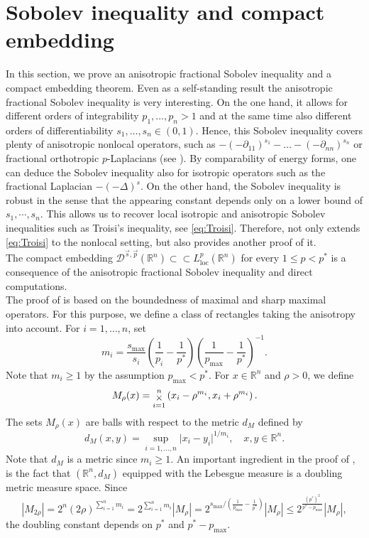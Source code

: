 \documentclass[11pt]{amsart}
\theoremstyle{plain}
\theoremstyle{definition}
\numberwithin{equation}{section}
\newcommand{\R}{\mathbb{R}}
\newcommand{\Dsp}{\mathcal{D}^{\vec{s},\vec{p}}(\mathbb{R}^n)}
\newcommand{\BIGOP}[1]
{
\mathop{\mathchoice%
{\raise-0.22em\hbox{\huge $#1$}}%
{\raise-0.05em\hbox{\Large $#1$}}{\hbox{\large $#1$}}{#1}}}
\newcommand{\bigtimes}{\BIGOP{\times}}
\begin{document}
\section{Sobolev inequality and compact embedding}\label{sec:Sob}
In this section, we prove an anisotropic fractional Sobolev inequality and a compact embedding theorem. 
Even as a self-standing result the anisotropic fractional Sobolev inequality is very interesting. On the one hand, it allows for different orders of integrability $p_1,\dots,p_n>1$ and at the same time also different orders of differentiability $s_1,\dots,s_n\in(0,1)$. Hence, this Sobolev inequality covers plenty of anisotropic nonlocal operators, such as $-(-\partial_{11})^{s_1} - \dots - (-\partial_{nn})^{s_n}$ or fractional orthotropic $p$-Laplacians (see \cite{CK}). 
By comparability of energy forms, one can deduce the Sobolev inequality also for isotropic operators such as the fractional Laplacian $-(-\Delta)^s$. On the other hand, the Sobolev inequality is robust in the sense that the appearing constant depends only on a lower bound of $s_1,\cdots,s_n$. This allows us to recover local isotropic and anisotropic Sobolev inequalities such as Troisi’s inequality, see \eqref{eq:Troisi}. Therefore,  not only extends \eqref{eq:Troisi} to the nonlocal setting, but also provides another proof of it.\\
The compact embedding $\Dsp \subset\subset L^{p}_{\mathrm{loc}}(\R^n)$ for every $1 \le p < p^{\ast}$ is a consequence of the anisotropic  fractional Sobolev inequality and direct computations.\\

The proof of  is based on the boundedness of maximal and sharp maximal operators. For this purpose, we define a class of rectangles taking the anisotropy into account. For $i=1,\dots, n$, set
\begin{equation} \label{eq:m_i}
m_i = \frac{s_{\max}}{s_i} \left( \frac{1}{p_i} - \frac{1}{p^{\ast}} \right) \left( \frac{1}{p_{\max}} - \frac{1}{p^{\ast}} \right)^{-1}.
\end{equation}
Note that $m_i \geq 1$ by the assumption $p_{\max} < p^{\ast}$. For $x \in \mathbb{R}^n$ and $\rho > 0$, we define
\begin{equation} \label{eq:M}
M_{\rho}(x) = \bigtimes_{i=1}^n \left(x_i-\rho^{m_i},x_i+\rho^{m_i} \right).
\end{equation}
The sets $M_{\rho}(x)$ are balls with respect to the metric $d_M$ defined by
\begin{equation*}
d_M(x,y) = \sup_{i = 1,\dots,n} \vert x_i-y_i\vert^{1/m_i}, \quad x,y \in \R^n.
\end{equation*}
Note that $d_M$ is a metric since $m_i \ge 1$. An important ingredient in the proof of , is the fact that $(\R^n, d_M)$ equipped with the Lebesgue measure is a doubling metric measure space. Since
\begin{equation*}
|M_{2\rho}| = 2^n (2\rho)^{\sum_{i=1}^n m_i} = 2^{\sum_{i=1}^n m_i} |M_{\rho}| = 2^{s_{\max}/(\frac{1}{p_{\max}}-\frac{1}{p^{\ast}})}|M_{\rho}| \leq 2^{\frac{(p^{\ast})^2}{p^{\ast}-p_{\max}}}|M_{\rho}|,
\end{equation*}
the doubling constant depends on $p^{\ast}$ and $p^{\ast}-p_{\max}$.
\end{document}
